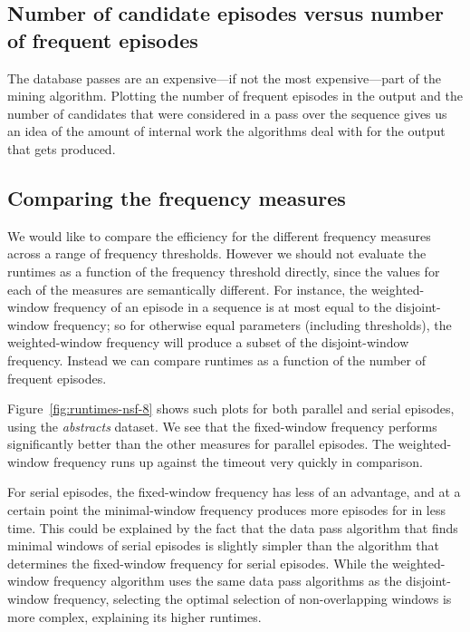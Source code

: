 \subsection{Number of candidate episodes versus number of frequent episodes}

The database passes are an expensive---if not the most expensive---part of the mining algorithm. Plotting the number of frequent episodes in the output and the number of candidates that were considered in a pass over the sequence gives us an idea of the amount of internal work the algorithms deal with for the output that gets produced.

\subsection{Comparing the frequency measures}

We would like to compare the efficiency for the different frequency measures across a range of frequency thresholds. However we should not evaluate the runtimes as a function of the frequency threshold directly, since the values for each of the measures are semantically different. For instance, the weighted-window frequency of an episode in a sequence is at most equal to the disjoint-window frequency; so for otherwise equal parameters (including thresholds), the weighted-window frequency will produce a subset of the disjoint-window frequency. Instead we can compare runtimes as a function of the number of frequent episodes.

Figure~\ref{fig:runtimes-nsf-8} shows such plots for both parallel and serial episodes, using the \emph{abstracts} dataset. We see that the fixed-window frequency performs significantly better than the other measures for parallel episodes. The weighted-window frequency runs up against the timeout very quickly in comparison.

For serial episodes, the fixed-window frequency has less of an advantage, and at a certain point the minimal-window frequency produces more episodes for in less time. This could be explained by the fact that the data pass algorithm that finds minimal windows of serial episodes is slightly simpler than the algorithm that determines the fixed-window frequency for serial episodes. While the weighted-window frequency algorithm uses the same data pass algorithms as the disjoint-window frequency, selecting the optimal selection of non-overlapping windows is more complex, explaining its higher runtimes.

